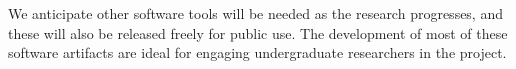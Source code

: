 We anticipate other software tools will be needed as the research progresses, and these will also be released freely for public use.
The development of most of these software artifacts are ideal for engaging undergraduate researchers in the project.


